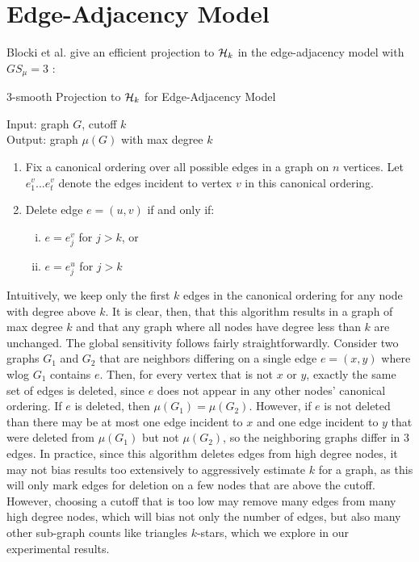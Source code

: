 \section{Edge-Adjacency Model}

Blocki et al. give an efficient projection to $\mathcal{H}_k$ in the edge-adjacency model with $GS_\mu = 3$  \cite{BBDS13}:

\begin{algorithm}[!ht]
	\caption{3-smooth Projection to $\mathcal{H}_k$ for Edge-Adjacency Model}
	Input: graph $G$, cutoff $k$ \\
	Output: graph $\mu(G)$ with max degree $k$
	
	\vspace{0.1in}
	\begin{enumerate}
		\item  Fix a canonical ordering over all possible edges in a graph on $n$ vertices. Let $e_1^v...e_t^v$ denote the edges incident to vertex $v$ in this canonical ordering.
		\item Delete edge $e = (u,v)$ if and only if:
		\begin{enumerate}[(i)]
			\item $e = e_j^v$ for $j > k$, or
			\item $e = e_j^u$ for $j > k$
		\end{enumerate}
	\end{enumerate}
\end{algorithm}

Intuitively, we keep only the first $k$ edges in the canonical ordering for any node with degree above $k$. It is clear, then, that this algorithm results in a graph of max degree $k$ and that any graph where all nodes have degree less than $k$ are unchanged. The global sensitivity follows fairly straightforwardly. Consider two graphs $G_1$ and $G_2$ that are neighbors differing on a single edge $e=(x,y)$ where wlog $G_1$ contains $e$. Then, for every vertex that is not $x$ or $y$, exactly the same set of edges is deleted, since $e$ does not appear in any other nodes' canonical ordering. If $e$ is deleted, then $\mu(G_1) = \mu(G_2)$. However, if $e$ is not deleted than there may be at most one edge incident to $x$ and one edge incident to $y$ that were deleted from $\mu(G_1)$ but not $\mu(G_2)$, so the neighboring graphs differ in $3$ edges. In practice, since this algorithm deletes edges from high degree nodes, it may not bias results too extensively to aggressively estimate $k$ for a graph, as this will only mark edges for deletion on a few nodes that are above the cutoff. However, choosing a cutoff that is too low may remove many edges from many high degree nodes, which will bias not only the number of edges, but also many other sub-graph counts like triangles $k$-stars, which we explore in our experimental results.

